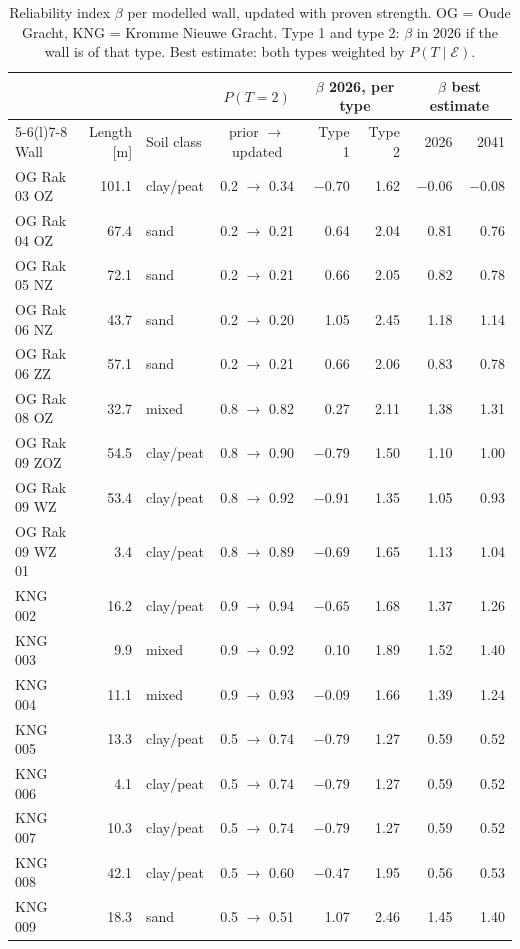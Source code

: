 \begin{table}[htbp]
\centering
\small
\caption{Reliability index $\beta$ per modelled wall, updated with proven
strength. OG = Oude Gracht, KNG = Kromme Nieuwe Gracht. Type 1 and type 2:
$\beta$ in 2026 if the wall is of that type. Best estimate: both types
weighted by $P(T \mid \mathcal{E})$.}
\label{tab:prob-results}
\setlength{\tabcolsep}{5pt}
\begin{tabular}{@{}l r l c r r r r@{}}
\toprule
 & & & $P(T{=}2)$ & \multicolumn{2}{c}{$\beta$ 2026, per type} & \multicolumn{2}{c}{$\beta$ best estimate} \\
\cmidrule(lr){5-6}\cmidrule(l){7-8}
Wall & Length [m] & Soil class & prior $\rightarrow$ updated & Type 1 & Type 2 & 2026 & 2041 \\
\midrule
OG Rak 03 OZ    & 101.1 & clay/peat & 0.2 $\rightarrow$ 0.34 & $-0.70$ & 1.62 & $-0.06$ & $-0.08$ \\
OG Rak 04 OZ    &  67.4 & sand      & 0.2 $\rightarrow$ 0.21 & 0.64    & 2.04 & 0.81    & 0.76 \\
OG Rak 05 NZ    &  72.1 & sand      & 0.2 $\rightarrow$ 0.21 & 0.66    & 2.05 & 0.82    & 0.78 \\
OG Rak 06 NZ    &  43.7 & sand      & 0.2 $\rightarrow$ 0.20 & 1.05    & 2.45 & 1.18    & 1.14 \\
OG Rak 06 ZZ    &  57.1 & sand      & 0.2 $\rightarrow$ 0.21 & 0.66    & 2.06 & 0.83    & 0.78 \\
OG Rak 08 OZ    &  32.7 & mixed     & 0.8 $\rightarrow$ 0.82 & 0.27    & 2.11 & 1.38    & 1.31 \\
OG Rak 09 ZOZ   &  54.5 & clay/peat & 0.8 $\rightarrow$ 0.90 & $-0.79$ & 1.50 & 1.10    & 1.00 \\
OG Rak 09 WZ    &  53.4 & clay/peat & 0.8 $\rightarrow$ 0.92 & $-0.91$ & 1.35 & 1.05    & 0.93 \\
OG Rak 09 WZ 01 &   3.4 & clay/peat & 0.8 $\rightarrow$ 0.89 & $-0.69$ & 1.65 & 1.13    & 1.04 \\
KNG 002         &  16.2 & clay/peat & 0.9 $\rightarrow$ 0.94 & $-0.65$ & 1.68 & 1.37    & 1.26 \\
KNG 003         &   9.9 & mixed     & 0.9 $\rightarrow$ 0.92 & 0.10    & 1.89 & 1.52    & 1.40 \\
KNG 004         &  11.1 & mixed     & 0.9 $\rightarrow$ 0.93 & $-0.09$ & 1.66 & 1.39    & 1.24 \\
KNG 005         &  13.3 & clay/peat & 0.5 $\rightarrow$ 0.74 & $-0.79$ & 1.27 & 0.59    & 0.52 \\
KNG 006         &   4.1 & clay/peat & 0.5 $\rightarrow$ 0.74 & $-0.79$ & 1.27 & 0.59    & 0.52 \\
KNG 007         &  10.3 & clay/peat & 0.5 $\rightarrow$ 0.74 & $-0.79$ & 1.27 & 0.59    & 0.52 \\
KNG 008         &  42.1 & clay/peat & 0.5 $\rightarrow$ 0.60 & $-0.47$ & 1.95 & 0.56    & 0.53 \\
KNG 009         &  18.3 & sand      & 0.5 $\rightarrow$ 0.51 & 1.07    & 2.46 & 1.45    & 1.40 \\
\bottomrule
\end{tabular}
\end{table}

